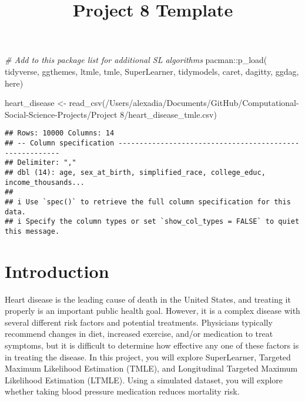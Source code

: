 \documentclass[
]{article}
\title{Project 8 Template}
\author{}
\date{\vspace{-2.5em}}
\newenvironment{Shaded}{\begin{snugshade}}{\end{snugshade}}
\newcommand{\CommentTok}[1]{\textcolor[rgb]{0.56,0.35,0.01}{\textit{#1}}}
\newcommand{\FunctionTok}[1]{\textcolor[rgb]{0.00,0.00,0.00}{#1}}
\newcommand{\NormalTok}[1]{#1}
\newcommand{\OtherTok}[1]{\textcolor[rgb]{0.56,0.35,0.01}{#1}}
\newcommand{\SpecialCharTok}[1]{\textcolor[rgb]{0.00,0.00,0.00}{#1}}
\newcommand{\StringTok}[1]{\textcolor[rgb]{0.31,0.60,0.02}{#1}}
\begin{document}
\maketitle

\begin{Shaded}
\begin{Highlighting}[]
\CommentTok{\# Add to this package list for additional SL algorithms}
\NormalTok{pacman}\SpecialCharTok{::}\FunctionTok{p\_load}\NormalTok{(}
\NormalTok{  tidyverse,}
\NormalTok{  ggthemes,}
\NormalTok{  ltmle,}
\NormalTok{  tmle,}
\NormalTok{  SuperLearner,}
\NormalTok{  tidymodels,}
\NormalTok{  caret,}
\NormalTok{  dagitty,}
\NormalTok{  ggdag,}
\NormalTok{  here)}

\NormalTok{heart\_disease }\OtherTok{\textless{}{-}} \FunctionTok{read\_csv}\NormalTok{(}\StringTok{\textquotesingle{}/Users/alexadia/Documents/GitHub/Computational{-}Social{-}Science{-}Projects/Project 8/heart\_disease\_tmle.csv\textquotesingle{}}\NormalTok{)}
\end{Highlighting}
\end{Shaded}

\begin{verbatim}
## Rows: 10000 Columns: 14
## -- Column specification --------------------------------------------------------
## Delimiter: ","
## dbl (14): age, sex_at_birth, simplified_race, college_educ, income_thousands...
## 
## i Use `spec()` to retrieve the full column specification for this data.
## i Specify the column types or set `show_col_types = FALSE` to quiet this message.
\end{verbatim}

\hypertarget{introduction}{%
\section{Introduction}\label{introduction}}

Heart disease is the leading cause of death in the United States, and
treating it properly is an important public health goal. However, it is
a complex disease with several different risk factors and potential
treatments. Physicians typically recommend changes in diet, increased
exercise, and/or medication to treat symptoms, but it is difficult to
determine how effective any one of these factors is in treating the
disease. In this project, you will explore SuperLearner, Targeted
Maximum Likelihood Estimation (TMLE), and Longitudinal Targeted Maximum
Likelihood Estimation (LTMLE). Using a simulated dataset, you will
explore whether taking blood pressure medication reduces mortality risk.
\end{document}
